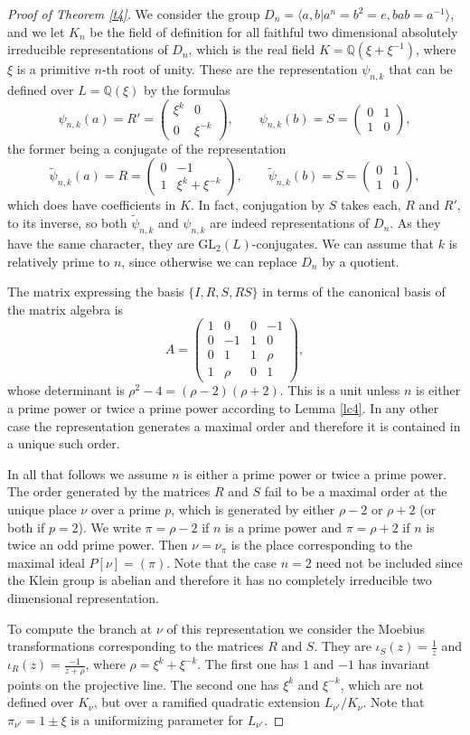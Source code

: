 \documentclass{article}
\theoremstyle{definition}
\theoremstyle{remark}
\newcommand\bmattrix[4]{\left(\begin{array}{cc}#1&#2\\#3&#4\end{array}\right)}
\begin{document}
\begin{proof}[Proof of Theorem \ref{t4}]
We consider the group 
$D_n=\langle a,b|a^n=b^2=e, bab=a^{-1}\rangle$,
and we let $K_n$ be the field of definition for all 
faithful two dimensional absolutely irreducible 
representations of $D_n$, which is the real field 
$K=\mathbb{Q}(\xi+\xi^{-1})$, where
$\xi$ is a primitive $n$-th root of 
unity. These are the representation
$\psi_{n,k}$ that can be defined over 
$L=\mathbb{Q}(\xi)$ by the formulas
$$\psi_{n,k}(a)=R'=
\bmattrix {\xi^k}00{\xi^{-k}},
\qquad\psi_{n,k}(b)=S=\bmattrix0110,$$
the former being a conjugate of the representation
$$\tilde{\psi}_{n,k}(a)=R=
\bmattrix 0{-1}1{\xi^k+\xi^{-k}},
\qquad\tilde{\psi}_{n,k}(b)=S=\bmattrix0110,$$
which does have coefficients in $K$.
In fact, conjugation by
$S$ takes each, $R$ and $R'$, to its inverse, 
so both $\tilde{\psi}_{n,k}$ and $\psi_{n,k}$ are
indeed representations of $D_n$. As they have the same
character, they are $\mathrm{GL}_2(L)$-conjugates.
We can assume that $k$ is relatively prime
to $n$, since otherwise we can replace
$D_n$ by a quotient.

The matrix expressing the basis $\{I,R,S,RS\}$
in terms of the canonical basis of the matrix 
algebra is 
$$A=\left(\begin{array}{cccc}1&0&0&-1\\
0&-1&1&0\\0&1&1&\rho\\
1&\rho&0&1\end{array}\right),$$
whose determinant is $\rho^2-4=(\rho-2)(\rho+2)$.
This is a unit unless $n$ is either a prime power
or twice a prime power according to
Lemma \ref{lc4}. In any other case the 
representation generates a maximal order
and therefore it is contained in a unique 
such order.

In all that follows we assume $n$ is either a 
prime power or twice a prime power. The order
generated by the matrices $R$ and $S$ fail to be 
a maximal order at the unique place $\nu$ over
a prime $p$, which is generated by either
$\rho-2$ or $\rho+2$ (or both if $p=2$).
We write $\pi=\rho-2$ if $n$ is a prime power
and $\pi=\rho+2$ if $n$ is twice an odd prime 
power. Then $\nu=\nu_\pi$ is the place corresponding to the 
maximal ideal $P[\nu]=(\pi)$.
Note that the case $n=2$ need not be
included
since the Klein group is abelian and therefore
it has no completely irreducible two dimensional
representation.


To compute the branch at $\nu$ of this representation
we consider the Moebius transformations 
corresponding to the matrices $R$ and $S$.
They are $\iota_S(z)=\frac1z$ 
and $\iota_R(z)=\frac{-1}{z+\rho}$, where 
$\rho=\xi^k+\xi^{-k}$. The first one has
$1$ and $-1$ has invariant points on the 
projective line. The second one has $\xi^k$
and $\xi^{-k}$, which are not defined over 
$K_\nu$, but over a ramified quadratic extension
$L_{\nu'}/K_\nu$. Note that $\pi_{\nu'}=1\pm\xi$ is
a uniformizing parameter for $L_{\nu'}$. 


\end{proof}
\end{document}
